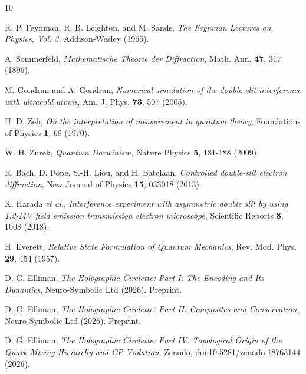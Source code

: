 \documentclass[submission, Phys]{SciPost}
\begin{document}

\begin{thebibliography}{10}

R. P. Feynman, R. B. Leighton, and M. Sands, \textit{The Feynman Lectures on Physics, Vol. 3}, Addison-Wesley (1965).

A. Sommerfeld, \textit{Mathematische Theorie der Diffraction}, Math. Ann. \textbf{47}, 317 (1896).

M. Gondran and A. Gondran, \textit{Numerical simulation of the double-slit interference with ultracold atoms}, Am. J. Phys. \textbf{73}, 507 (2005).

H. D. Zeh, \textit{On the interpretation of measurement in quantum theory}, Foundations of Physics \textbf{1}, 69 (1970).

W. H. Zurek, \textit{Quantum Darwinism}, Nature Physics \textbf{5}, 181-188 (2009).

R. Bach, D. Pope, S.-H. Liou, and H. Batelaan, \textit{Controlled double-slit electron diffraction}, New Journal of Physics \textbf{15}, 033018 (2013).

K. Harada \textit{et al.}, \textit{Interference experiment with asymmetric double slit by using 1.2-MV field emission transmission electron microscope}, Scientific Reports \textbf{8}, 1008 (2018).

H. Everett, \textit{Relative State Formulation of Quantum Mechanics}, Rev. Mod. Phys. \textbf{29}, 454 (1957).

D. G. Elliman, \textit{The Holographic Circlette: Part I: The Encoding and Its Dynamics}, Neuro-Symbolic Ltd (2026). Preprint.

D. G. Elliman, \textit{The Holographic Circlette: Part II: Composites and Conservation}, Neuro-Symbolic Ltd (2026). Preprint.

D. G. Elliman, \textit{The Holographic Circlette: Part IV: Topological Origin of the Quark Mixing Hierarchy and CP Violation}, Zenodo, doi:10.5281/zenodo.18763144 (2026).

\end{thebibliography}
\end{document}

